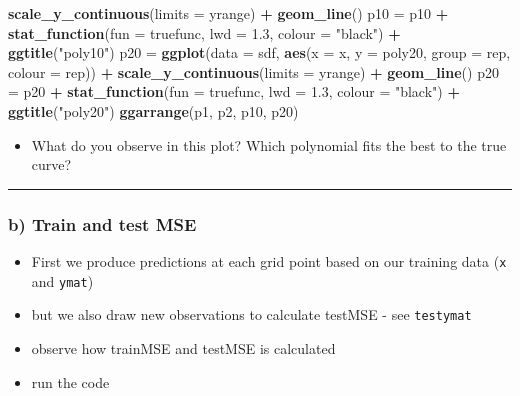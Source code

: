 \documentclass[]{article}
\newenvironment{Shaded}{\begin{snugshade}}{\end{snugshade}}
\newcommand{\KeywordTok}[1]{\textcolor[rgb]{0.13,0.29,0.53}{\textbf{#1}}}
\newcommand{\DataTypeTok}[1]{\textcolor[rgb]{0.13,0.29,0.53}{#1}}
\newcommand{\FloatTok}[1]{\textcolor[rgb]{0.00,0.00,0.81}{#1}}
\newcommand{\StringTok}[1]{\textcolor[rgb]{0.31,0.60,0.02}{#1}}
\newcommand{\OperatorTok}[1]{\textcolor[rgb]{0.81,0.36,0.00}{\textbf{#1}}}
\newcommand{\NormalTok}[1]{#1}
\providecommand{\tightlist}{%
  \setlength{\itemsep}{0pt}\setlength{\parskip}{0pt}}
\begin{document}
\begin{Shaded}
\begin{Highlighting}[]
\StringTok{    }\KeywordTok{scale_y_continuous}\NormalTok{(}\DataTypeTok{limits =}\NormalTok{ yrange) }\OperatorTok{+}\StringTok{ }\KeywordTok{geom_line}\NormalTok{()}
\NormalTok{p10 =}\StringTok{ }\NormalTok{p10 }\OperatorTok{+}\StringTok{ }\KeywordTok{stat_function}\NormalTok{(}\DataTypeTok{fun =}\NormalTok{ truefunc, }\DataTypeTok{lwd =} \FloatTok{1.3}\NormalTok{, }\DataTypeTok{colour =} \StringTok{"black"}\NormalTok{) }\OperatorTok{+}\StringTok{ }
\StringTok{    }\KeywordTok{ggtitle}\NormalTok{(}\StringTok{"poly10"}\NormalTok{)}
\NormalTok{p20 =}\StringTok{ }\KeywordTok{ggplot}\NormalTok{(}\DataTypeTok{data =}\NormalTok{ sdf, }\KeywordTok{aes}\NormalTok{(}\DataTypeTok{x =}\NormalTok{ x, }\DataTypeTok{y =}\NormalTok{ poly20, }\DataTypeTok{group =}\NormalTok{ rep, }\DataTypeTok{colour =}\NormalTok{ rep)) }\OperatorTok{+}\StringTok{ }
\StringTok{    }\KeywordTok{scale_y_continuous}\NormalTok{(}\DataTypeTok{limits =}\NormalTok{ yrange) }\OperatorTok{+}\StringTok{ }\KeywordTok{geom_line}\NormalTok{()}
\NormalTok{p20 =}\StringTok{ }\NormalTok{p20 }\OperatorTok{+}\StringTok{ }\KeywordTok{stat_function}\NormalTok{(}\DataTypeTok{fun =}\NormalTok{ truefunc, }\DataTypeTok{lwd =} \FloatTok{1.3}\NormalTok{, }\DataTypeTok{colour =} \StringTok{"black"}\NormalTok{) }\OperatorTok{+}\StringTok{ }
\StringTok{    }\KeywordTok{ggtitle}\NormalTok{(}\StringTok{"poly20"}\NormalTok{)}
\KeywordTok{ggarrange}\NormalTok{(p1, p2, p10, p20)}
\end{Highlighting}
\end{Shaded}

\begin{itemize}
\tightlist
\item
  What do you observe in this plot? Which polynomial fits the best to
  the true curve?
\end{itemize}

\begin{center}\rule{0.5\linewidth}{\linethickness}\end{center}

\subsubsection{b) Train and test MSE}\label{b-train-and-test-mse}

\begin{itemize}
\tightlist
\item
  First we produce predictions at each grid point based on our training
  data (\texttt{x} and \texttt{ymat})
\item
  but we also draw new observations to calculate testMSE - see
  \texttt{testymat}
\item
  observe how trainMSE and testMSE is calculated
\item
  run the code
\end{itemize}
\end{document}
